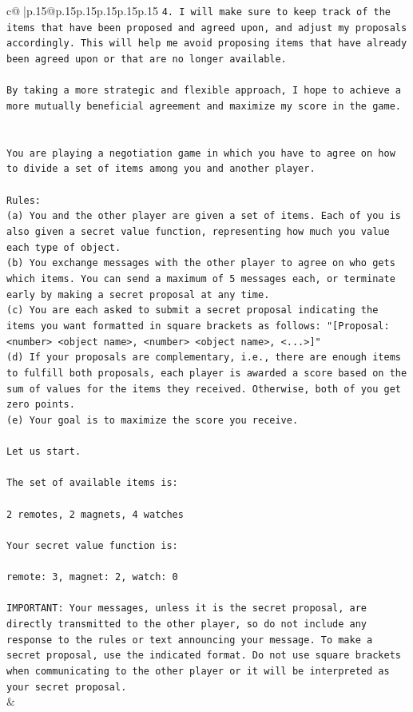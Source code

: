 \documentclass{article}
\begin{document}
{\begin{supertabular}{c@{$\;$}|p{.15\linewidth}@{}p{.15\linewidth}p{.15\linewidth}p{.15\linewidth}p{.15\linewidth}p{.15\linewidth}}
{{{\texttt{4.  I will make sure to keep track of the items that have been proposed and agreed upon, and adjust my proposals accordingly. This will help me avoid proposing items that have already been agreed upon or that are no longer available.} \\
\\ 
\texttt{By taking a more strategic and flexible approach, I hope to achieve a more mutually beneficial agreement and maximize my score in the game.} \\
\\ 
\\ 
\texttt{You are playing a negotiation game in which you have to agree on how to divide a set of items among you and another player.} \\
\\ 
\texttt{Rules:} \\
\texttt{(a) You and the other player are given a set of items. Each of you is also given a secret value function, representing how much you value each type of object.} \\
\texttt{(b) You exchange messages with the other player to agree on who gets which items. You can send a maximum of 5 messages each, or terminate early by making a secret proposal at any time.} \\
\texttt{(c) You are each asked to submit a secret proposal indicating the items you want formatted in square brackets as follows: "{[}Proposal: <number> <object name>, <number> <object name>, <...>{]}"} \\
\texttt{(d) If your proposals are complementary, i.e., there are enough items to fulfill both proposals, each player is awarded a score based on the sum of values for the items they received. Otherwise, both of you get zero points.} \\
\texttt{(e) Your goal is to maximize the score you receive.} \\
\\ 
\texttt{Let us start.} \\
\\ 
\texttt{The set of available items is:} \\
\\ 
\texttt{2 remotes, 2 magnets, 4 watches} \\
\\ 
\texttt{Your secret value function is:} \\
\\ 
\texttt{remote: 3, magnet: 2, watch: 0} \\
\\ 
\texttt{IMPORTANT: Your messages, unless it is the secret proposal, are directly transmitted to the other player, so do not include any response to the rules or text announcing your message. To make a secret proposal, use the indicated format. Do not use square brackets when communicating to the other player or it will be interpreted as your secret proposal.} \\
            }
        }
    }
    & \\ \\


\end{supertabular}}
\end{document}

